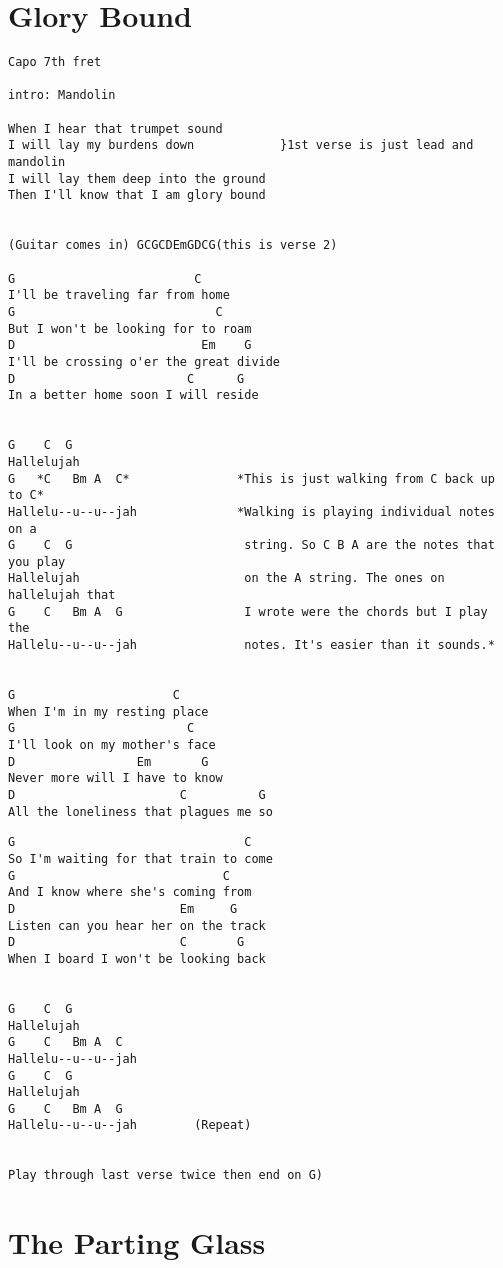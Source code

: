 \documentclass[leqno]{memoir}
\begin{document}
\chapter{Glory Bound}
\begin{verbatim}
Capo 7th fret

intro: Mandolin

When I hear that trumpet sound
I will lay my burdens down            }1st verse is just lead and mandolin
I will lay them deep into the ground
Then I'll know that I am glory bound


(Guitar comes in) GCGCDEmGDCG(this is verse 2)

G                         C
I'll be traveling far from home
G                            C
But I won't be looking for to roam
D                          Em    G       
I'll be crossing o'er the great divide
D                        C      G
In a better home soon I will reside


G    C  G
Hallelujah
G   *C   Bm A  C*               *This is just walking from C back up to C*
Hallelu--u--u--jah              *Walking is playing individual notes on a 
G    C  G                        string. So C B A are the notes that you play 
Hallelujah                       on the A string. The ones on hallelujah that  
G    C   Bm A  G                 I wrote were the chords but I play the
Hallelu--u--u--jah               notes. It's easier than it sounds.*


G                      C 
When I'm in my resting place
G                        C
I'll look on my mother's face
D                 Em       G
Never more will I have to know
D                       C          G
All the loneliness that plagues me so
\end{verbatim}
\newpage
\begin{verbatim}
G                                C
So I'm waiting for that train to come
G                             C
And I know where she's coming from
D                       Em     G
Listen can you hear her on the track
D                       C       G
When I board I won't be looking back


G    C  G
Hallelujah
G    C   Bm A  C
Hallelu--u--u--jah
G    C  G
Hallelujah
G    C   Bm A  G
Hallelu--u--u--jah        (Repeat)


Play through last verse twice then end on G)

\end{verbatim}
\newpage\chapter{The Parting Glass}
\end{document}
